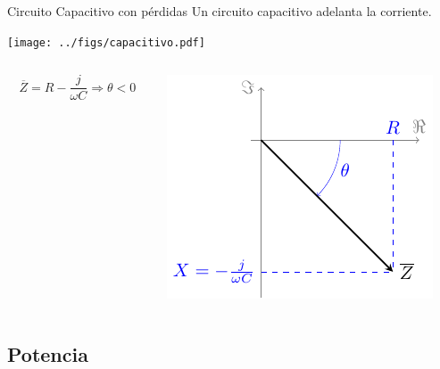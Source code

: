 \documentclass[xcolor={usenames,svgnames,dvipsnames}]{beamer}
\begin{document}
\begin{frame}[label={sec:org3423592}]{Circuito Capacitivo con pérdidas}
Un circuito capacitivo \alert{adelanta la corriente}.

\begin{center}
\texttt{[image: ../figs/capacitivo.pdf]}
\end{center}

\begin{columns}
\begin{column}{0.45\columnwidth}
\[
\overline{Z} = R - \frac{j}{\omega C} \Rightarrow \boxed{\theta < 0}
\]
\end{column}

\begin{column}{0.55\columnwidth}
\begin{center}
\includegraphics[height=0.45\textheight]{../figs/fasorCondensadorReal.pdf}
\end{center}
\end{column}
\end{columns}
\end{frame}


\subsection{Potencia}
\label{sec:orgeb06c92}
\end{document}
